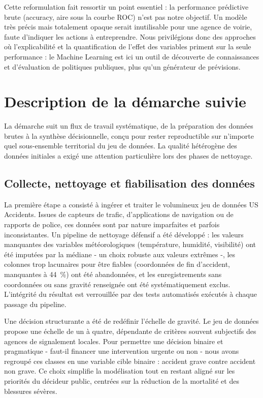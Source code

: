 \documentclass[12pt, a4paper]{article}
\begin{document}
Cette reformulation fait ressortir un point essentiel : la performance prédictive brute (accuracy, aire sous la courbe ROC) n'est pas notre objectif. Un modèle très précis mais totalement opaque serait inutilisable pour une agence de voirie, faute d'indiquer les actions à entreprendre. Nous privilégions donc des approches où l'explicabilité et la quantification de l'effet des variables priment sur la seule performance : le Machine Learning est ici un outil de découverte de connaissances et d'évaluation de politiques publiques, plus qu'un générateur de prévisions.

\section{Description de la démarche suivie}

La démarche suit un flux de travail systématique, de la préparation des données brutes à la synthèse décisionnelle, conçu pour rester reproductible sur n'importe quel sous-ensemble territorial du jeu de données. La qualité hétérogène des données initiales a exigé une attention particulière lors des phases de nettoyage.

\subsection{Collecte, nettoyage et fiabilisation des données}

La première étape a consisté à ingérer et traiter le volumineux jeu de données US Accidents. Issues de capteurs de trafic, d'applications de navigation ou de rapports de police, ces données sont par nature imparfaites et parfois inconsistantes. Un pipeline de nettoyage défensif a été développé : les valeurs manquantes des variables météorologiques (température, humidité, visibilité) ont été imputées par la médiane - un choix robuste aux valeurs extrêmes -, les colonnes trop lacunaires pour être fiables (coordonnées de fin d'accident, manquantes à 44~\%) ont été abandonnées, et les enregistrements sans coordonnées ou sans gravité renseignée ont été systématiquement exclus. L'intégrité du résultat est verrouillée par des tests automatisés exécutés à chaque passage du pipeline.

Une décision structurante a été de redéfinir l'échelle de gravité. Le jeu de données propose une échelle de un à quatre, dépendante de critères souvent subjectifs des agences de signalement locales. Pour permettre une décision binaire et pragmatique - faut-il financer une intervention urgente ou non - nous avons regroupé ces classes en une variable cible binaire : accident grave contre accident non grave. Ce choix simplifie la modélisation tout en restant aligné sur les priorités du décideur public, centrées sur la réduction de la mortalité et des blessures sévères.
\end{document}

